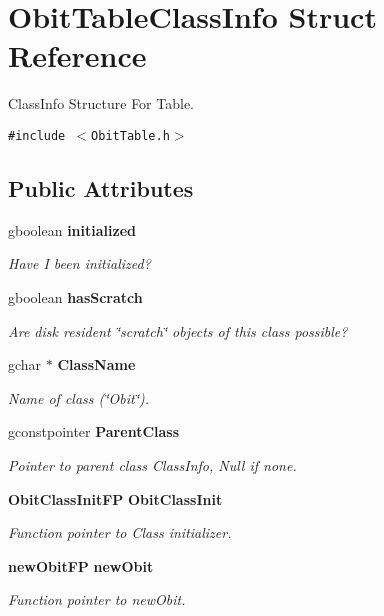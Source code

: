 \section{Obit\-Table\-Class\-Info Struct Reference}
\label{structObitTableClassInfo}
Class\-Info Structure For Table.  


{\tt \#include $<$Obit\-Table.h$>$}

\subsection*{Public Attributes}
\begin{CompactItemize}
\item 
gboolean {\bf initialized}
\begin{CompactList}\small\item\em Have I been initialized? \item\end{CompactList}\item 
gboolean {\bf has\-Scratch}
\begin{CompactList}\small\item\em Are disk resident \char`\"{}scratch\char`\"{} objects of this class possible? \item\end{CompactList}\item 
gchar $\ast$ {\bf Class\-Name}
\begin{CompactList}\small\item\em Name of class (\char`\"{}Obit\char`\"{}). \item\end{CompactList}\item 
gconstpointer {\bf Parent\-Class}
\begin{CompactList}\small\item\em Pointer to parent class Class\-Info, Null if none. \item\end{CompactList}\item 
{\bf Obit\-Class\-Init\-FP} {\bf Obit\-Class\-Init}
\begin{CompactList}\small\item\em Function pointer to Class initializer. \item\end{CompactList}\item 
{\bf new\-Obit\-FP} {\bf new\-Obit}
\begin{CompactList}\small\item\em Function pointer to new\-Obit. \item\end{CompactList}\item 

\end{CompactItemize}
